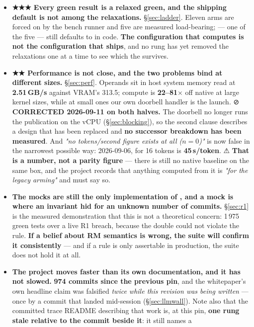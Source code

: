 \documentclass[10.5pt]{article}
\begin{document}
\begin{itemize}
  copy-engine round trip.
\item \textbf{★★★ Every green result is a relaxed green, and the shipping default is not among the
  relaxations.} \S\ref{sec:ladder}. Eleven arms are forced on by the bench runner and five are
  measured load-bearing;  — one of the five — still defaults to
   in code. \textbf{The configuration that computes is not the configuration that
  ships}, and no rung has yet removed the relaxations one at a time to see which the 
  survives.
\item \textbf{★★ Performance is not close, and the two problems bind at different sizes.}
  \S\ref{sec:perf}. Operands sit in host system memory read at \textbf{2.51\,GB/s} against VRAM's
  313.5; compute is \textbf{22--81$\times$} off native at large kernel sizes, while at small ones
  our own doorbell handler is the launch. ⊘ \textbf{CORRECTED 2026-09-11 on both halves.} The
  doorbell no longer runs the publication on the vCPU (\S\ref{sec:blocking}), so the second clause
  describes a design that has been replaced and \textbf{no successor breakdown has been measured}.
  And \emph{"no tokens/second figure exists at all ($n = 0$)"} is now false in the narrowest
  possible way: \measured{} 2026-09-06,  for 16 tokens is
  \textbf{45\,s/token}. ⚠ \textbf{That is a number, not a parity figure} --- there is still no
  native baseline on the same box, and the project records that anything computed from it is
  \emph{"for the legacy arming"} and must say so.
\item \textbf{The mocks are still the only implementation of , and a mock is where
  an invariant hid for an unknown number of commits.} \S\ref{sec:r1} is the measured
  demonstration that this is not a theoretical concern: 1\,975 green tests over a live R1 breach,
  because the double could not violate the rule. \textbf{If a belief about RM semantics is wrong,
  the suite will confirm it consistently} — and if a rule is only assertable in production, the
  suite does not hold it at all.
\item \textbf{The project moves faster than its own documentation, and it has not slowed.}
  \textbf{974 commits since the previous pin}, and the whitepaper's own headline claim was
  falsified \emph{twice while this revision was being written} — once by a commit that landed
  mid-session (\S\ref{sec:llmwall}). Note also that the committed trace README describing that
  work is, at this pin, \textbf{one rung stale relative to the commit beside it}: it still names a

\end{itemize}
\end{document}
